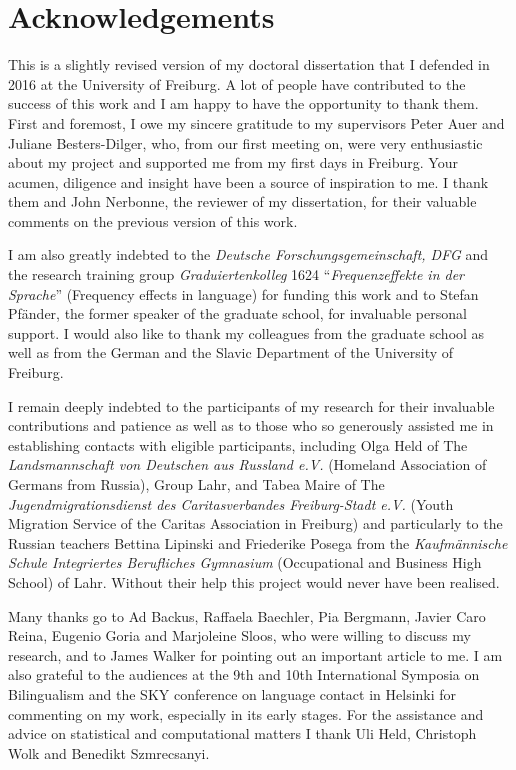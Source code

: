 \chapter*{Acknowledgements}

This is a slightly revised version of my doctoral dissertation that I defended in 2016 at the University of Freiburg. A lot of people have contributed to the success of this work and I am happy to have the opportunity to thank them. First and foremost, I owe my sincere gratitude to my supervisors Peter Auer and Juliane Besters-Dilger, who, from our first meeting on, were very enthusiastic about my project and supported me from my first days in Freiburg. Your acumen, diligence and insight have been a source of inspiration to me. I thank them and John Nerbonne, the reviewer of my dissertation, for their valuable comments on the previous version of this work. 

 I am also greatly indebted to the \textit{Deutsche Forschungsgemeinschaft, DFG} and the research training group \textit{Graduiertenkolleg} 1624 ``\textit{Frequenzeffekte in der Sprache}'' (Frequency effects in language) for funding this work and to Stefan Pfänder, the former speaker of the graduate school, for invaluable personal support. I would also like to thank my colleagues from the graduate school as well as from the German and the Slavic Department of the University of Freiburg.

I remain deeply indebted to the participants of my research for their invaluable contributions and patience as well as to those who so generously assisted me in establishing contacts with eligible participants, including Olga Held of The \textit{Landsmannschaft von Deutschen aus Russland e.V.} (Homeland Association of Germans from Russia), Group Lahr, and Tabea Maire of The \textit{Jugendmigrationsdienst des Caritasverbandes Freiburg-Stadt e.V.} (Youth Migration Service of the Caritas Association in Freiburg) and particularly to the Russian teachers Bettina Lipinski and Friederike Posega from the \textit{Kaufmännische Schule Integriertes Berufliches Gymnasium} (Occupational and Business High School) of Lahr. Without their help this project would never have been realised.

Many thanks go to Ad Backus, Raffaela Baechler, Pia Bergmann, Javier Caro Reina, Eugenio Goria and Marjoleine Sloos, who were willing to discuss my research, and to James Walker for pointing out an important article to me. I am also grateful to the audiences at the 9th and 10th International Symposia on Bilingualism and the SKY conference on language contact in Helsinki for commenting on my work, especially in its early stages. For the assistance and advice on statistical and computational matters I thank Uli Held, Christoph Wolk and Benedikt Szmrecsanyi.


